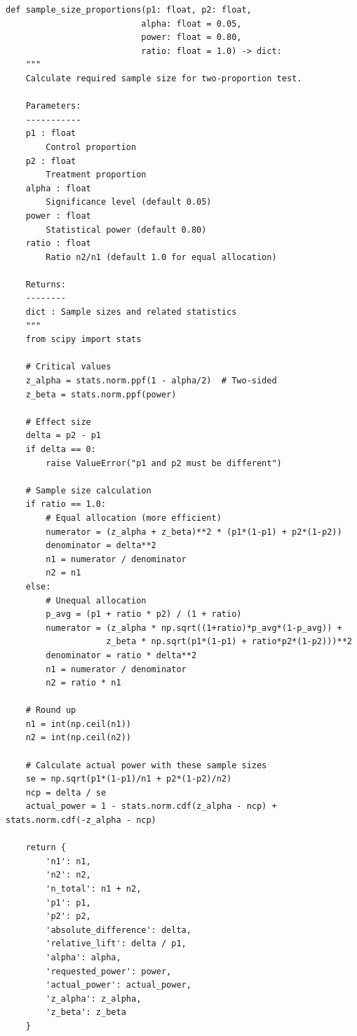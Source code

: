 \lstset{language=Python, caption=Sample Size Calculator for Proportions, label=lst:sample_size_proportions}
\begin{lstlisting}
def sample_size_proportions(p1: float, p2: float,
                           alpha: float = 0.05,
                           power: float = 0.80,
                           ratio: float = 1.0) -> dict:
    """
    Calculate required sample size for two-proportion test.

    Parameters:
    -----------
    p1 : float
        Control proportion
    p2 : float
        Treatment proportion
    alpha : float
        Significance level (default 0.05)
    power : float
        Statistical power (default 0.80)
    ratio : float
        Ratio n2/n1 (default 1.0 for equal allocation)

    Returns:
    --------
    dict : Sample sizes and related statistics
    """
    from scipy import stats

    # Critical values
    z_alpha = stats.norm.ppf(1 - alpha/2)  # Two-sided
    z_beta = stats.norm.ppf(power)

    # Effect size
    delta = p2 - p1
    if delta == 0:
        raise ValueError("p1 and p2 must be different")

    # Sample size calculation
    if ratio == 1.0:
        # Equal allocation (more efficient)
        numerator = (z_alpha + z_beta)**2 * (p1*(1-p1) + p2*(1-p2))
        denominator = delta**2
        n1 = numerator / denominator
        n2 = n1
    else:
        # Unequal allocation
        p_avg = (p1 + ratio * p2) / (1 + ratio)
        numerator = (z_alpha * np.sqrt((1+ratio)*p_avg*(1-p_avg)) +
                    z_beta * np.sqrt(p1*(1-p1) + ratio*p2*(1-p2)))**2
        denominator = ratio * delta**2
        n1 = numerator / denominator
        n2 = ratio * n1

    # Round up
    n1 = int(np.ceil(n1))
    n2 = int(np.ceil(n2))

    # Calculate actual power with these sample sizes
    se = np.sqrt(p1*(1-p1)/n1 + p2*(1-p2)/n2)
    ncp = delta / se
    actual_power = 1 - stats.norm.cdf(z_alpha - ncp) + stats.norm.cdf(-z_alpha - ncp)

    return {
        'n1': n1,
        'n2': n2,
        'n_total': n1 + n2,
        'p1': p1,
        'p2': p2,
        'absolute_difference': delta,
        'relative_lift': delta / p1,
        'alpha': alpha,
        'requested_power': power,
        'actual_power': actual_power,
        'z_alpha': z_alpha,
        'z_beta': z_beta
    }



\end{lstlisting}
